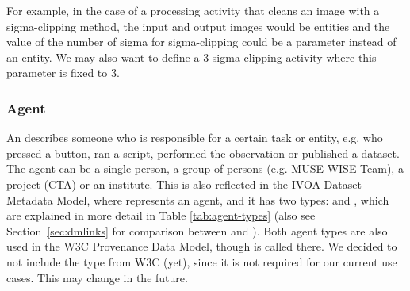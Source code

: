 For example, in the case of a processing activity that cleans an image with a sigma-clipping method, the input and output images would be entities and the value of the number of sigma for sigma-clipping could be a parameter instead of an entity. 
We may also want to define a 3-sigma-clipping activity where this parameter is fixed to 3.


%




\subsubsection{Agent}\label{sec:w3c-agent}

An  describes someone who is responsible for a certain task or
entity, e.g. who pressed a button, 
ran a script, performed the observation or published a dataset.
The agent can be a single person, a group of persons (e.g. MUSE WISE Team), a 
project (CTA) or an institute. 
This is also reflected in the IVOA Dataset Metadata Model, where  
represents an agent, and it has two types:  and ,
which are explained in more detail in Table \ref{tab:agent-types} (also see Section~\ref{sec:dmlinks} for comparison between  and ).
Both agent types are also used in the W3C Provenance Data Model, though 
 is called  there.
We decided to not include the type  from W3C (yet), since it is not required for our current use cases. This may change in the future.

